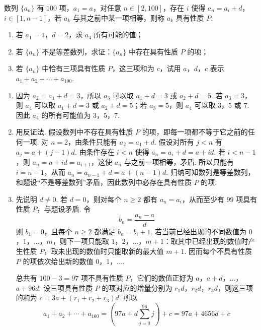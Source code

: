 \begin{problem}
数列 \(\{a_n\}\) 有 \(100\) 项，\(a_1=a\)，对任意 \(n\in[2,100]\)，存在 \(i\) 使得 \(a_n=a_i+d\)，\(i\in[1,n-1]\)，若 \(a_k\) 与其之前中某一项相等，则称 \(a_k\) 具有性质 \(P\).

\begin{enumerate}
\item 若 \(a_1=1\)，\(d=2\)，求 \(a_4\) 所有可能的值；
\item 若 \(\{a_n\}\) 不是等差数列，求证：\(\{a_n\}\) 中存在具有性质 \(P\) 的项；
\item 若 \(\{a_n\}\) 中恰有三项具有性质 \(P\)，这三项和为 \(c\)，试用 \(a\)，\(d\)，\(c\) 表示 \(a_1+a_2+\cdots+a_{100}\).
\end{enumerate}
\end{problem}

\begin{solution}
\begin{enumerate}
\item 因为 \(a_2=a_1+d=3\)，所以 \(a_3\) 可以取 \(a_1+d=3\) 或 \(a_2+d=5\). 若 \(a_3=3\)，则 \(a_4\) 可以取 \(a_1+d=3\) 或 \(a_2+d=5\)；若 \(a_3=5\)，则 \(a_4\) 可以取 \(3\)，\(5\) 或 \(7\). 因此 \(a_4\) 的所有可能值为 \(3\)，\(5\)，\(7\).
\item 用反证法. 假设数列中不存在具有性质 \(P\) 的项，即每一项都不等于它之前的任何一项. 对 \(n=2\)，由条件只能有 \(a_2=a_1+d\). 假设对所有 \(j<n\) 有 \(a_j=a+(j-1)d\). 由条件存在 \(i<n\) 使得 \(a_n=a_i+d=a+id\). 若 \(i<n-1\)，则 \(a_n=a+id=a_{i+1}\)，这使 \(a_n\) 与之前一项相等，矛盾. 所以只能有 \(i=n-1\)，从而 \(a_n=a_{n-1}+d=a+(n-1)d\). 归纳可知数列是等差数列，和题设“不是等差数列”矛盾，因此数列中必存在具有性质 \(P\) 的项.
\item 先说明 \(d\ne0\). 若 \(d=0\)，则对每个 \(n\ge2\) 都有 \(a_n=a_i\)，从而至少有 \(99\) 项具有性质 \(P\)，与题设矛盾. 令
\[
b_n=\frac{a_n-a}{d}
\]
则 \(b_1=0\)，且每个 \(n\ge2\) 都满足 \(b_n=b_i+1\). 若当前已经出现的不同数值为 \(0\)，\(1\)，\(\ldots\)，\(m\)，则下一项只能取 \(1\)，\(2\)，\(\ldots\)，\(m+1\)：取其中已经出现的数值时产生性质 \(P\)，取未出现的数值时只能取新的最大值 \(m+1\). 因而每个不具有性质 \(P\) 的项依次给出新的数值 \(0\)，\(1\)，\(\ldots\).

总共有 \(100-3=97\) 项不具有性质 \(P\)，它们的数值正好为 \(a\)，\(a+d\)，\(\ldots\)，\(a+96d\). 设三项具有性质 \(P\) 的项对应的增量分别为 \(r_1d\)，\(r_2d\)，\(r_3d\)，则这三项的和为 \(c=3a+(r_1+r_2+r_3)d\). 所以
\[
a_1+a_2+\cdots+a_{100}=\left(97a+d\sum_{j=0}^{96}j\right)+c=97a+4656d+c
\]
\end{enumerate}
\end{solution}
